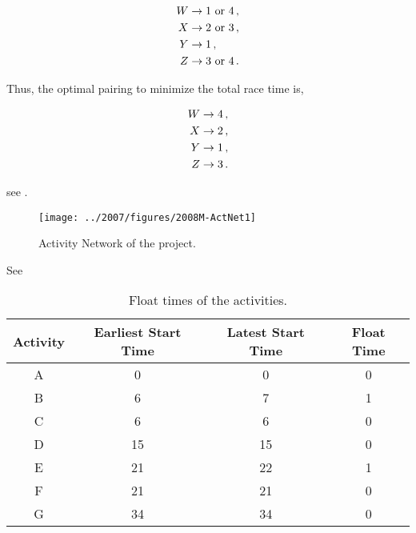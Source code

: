\begin{subquestions}
\begin{align}
	W & \rightarrow 1 ~\text{or} ~4 \,, \nonumber \\
	X & \rightarrow 2 ~\text{or} ~3 \,, \nonumber \\
	Y & \rightarrow 1 \,, \nonumber \\
	Z & \rightarrow 3 ~\text{or} ~4 \,.
\end{align}

Thus, the optimal pairing to minimize the total race time is,

\begin{align}
	W \rightarrow 4 \,, \nonumber \\
	X \rightarrow 2 \,, \nonumber \\
	Y \rightarrow 1 \,, \nonumber \\
	Z \rightarrow 3 \,.
\end{align}


\subquestion

see .

\begin{figure}
	\begin{center}
		\texttt{[image: ../2007/figures/2008M-ActNet1]}
		\caption{\label{2008M:q2:fig:ActNet1} Activity Network of the project.}
	\end{center}
\end{figure}


\subquestion 

\begin{subsubquestions}
	
\subsubquestion

See 

\begin{table}[ht]
	\centering
	\begin{tabular}{|c|c|c|c|}
		\hline
		Activity & Earliest Start Time & Latest Start Time & Float Time \\
		\hline
		A & 0 & 0 & 0 \\
		B & 6 & 7 & 1 \\
		C & 6 & 6 & 0 \\
		D & 15 & 15 & 0 \\
		E & 21 & 22 & 1 \\
		F & 21 & 21 & 0 \\
		G & 34 & 34 & 0 \\
		\hline
	\end{tabular}
	\caption{\label{2008M:q2:tab:ActNet2} Float times of the activities.}
\end{table} 


\end{subsubquestions}
\end{subquestions}
